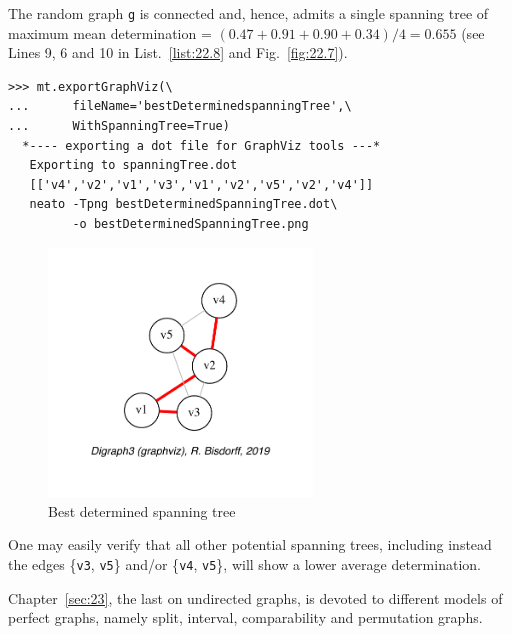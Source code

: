 The random graph \texttt{g} is connected and, hence, admits a single spanning tree of maximum mean determination = $(0.47 + 0.91 + 0.90 + 0.34)/4 = 0.655$ (see Lines 9, 6 and 10 in List.~\vref{list:22.8} and Fig.~\vref{fig:22.7}).
\begin{lstlisting}
>>> mt.exportGraphViz(\
...      fileName='bestDeterminedspanningTree',\
...      WithSpanningTree=True)
  *---- exporting a dot file for GraphViz tools ---*
   Exporting to spanningTree.dot
   [['v4','v2','v1','v3','v1','v2','v5','v2','v4']]
   neato -Tpng bestDeterminedSpanningTree.dot\
         -o bestDeterminedSpanningTree.png
\end{lstlisting}
\begin{figure}[ht]
\sidecaption[t]
\includegraphics[width=7cm]{Figures/22-7-bestDeterminedSpanningTree.pdf}
\caption{Best determined spanning tree} 
\label{fig:22.7}       %
\end{figure}

One may easily verify that all other potential spanning trees, including instead the edges \{\texttt{v3}, \texttt{v5}\} and/or \{\texttt{v4}, \texttt{v5}\}, will show a lower average determination.

\vspace{\baselineskip}

Chapter~\ref{sec:23}, the last on undirected graphs, is devoted to different models of perfect graphs, namely split, interval, comparability and permutation graphs. 
 
%


